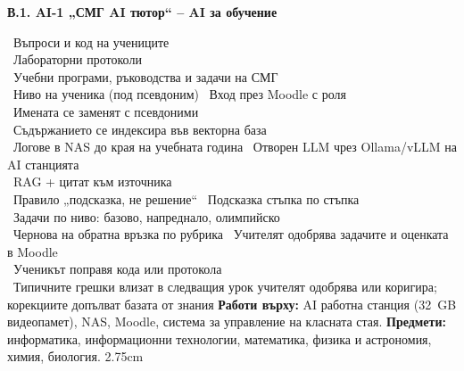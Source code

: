 \documentclass[11pt,a4paper]{article}
\begin{document}
\medskip
\noindent\begin{minipage}{\textwidth}
\textbf{\color{navy}В.1. AI-1 „СМГ AI тютор“ – AI за обучение}\par\smallskip
\AppVPipeline
{\textbullet~Въпроси и код на учениците\\
 \textbullet~Лабораторни протоколи\\
 \textbullet~Учебни програми, ръководства и задачи на СМГ\\
 \textbullet~Ниво на ученика (под псевдоним)}
{\textbullet~Вход през Moodle с роля\\
 \textbullet~Имената се заменят с псевдоними\\
 \textbullet~Съдържанието се индексира във векторна база\\
 \textbullet~Логове в NAS до края на учебната година}
{\textbullet~Отворен LLM чрез Ollama/vLLM на AI станцията\\
 \textbullet~RAG + цитат към източника\\
 \textbullet~Правило „подсказка, не решение“}
{\textbullet~Подсказка стъпка по стъпка\\
 \textbullet~Задачи по ниво: базово, напреднало, олимпийско\\
 \textbullet~Чернова на обратна връзка по рубрика}
{\textbullet~Учителят одобрява задачите и оценката в Moodle\\
 \textbullet~Ученикът поправя кода или протокола\\
 \textbullet~Типичните грешки влизат в следващия урок}
{учителят одобрява или коригира; корекциите допълват базата от знания}
{\textbf{Работи върху:} AI работна станция (32~GB видеопамет), NAS, Moodle, система за управление на класната стая. \textbf{Предмети:} информатика, информационни технологии, математика, физика и астрономия, химия, биология.}
{2.75cm}
\end{minipage}
\end{document}
